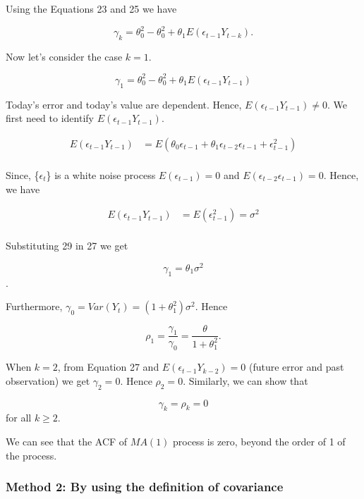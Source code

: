 \documentclass[
  11pt,
  a4paper,
]{report}
\begin{document}
Using the Equations 23 and 25 we have

\begin{equation}
  \gamma_k = \theta_0^2 - \theta_0^2 + \theta_1E(\epsilon_{t-1}Y_{t-k}).
\end{equation}

Now let's consider the case \(k=1\).

\begin{equation}
  \gamma_1 = \theta_0^2 - \theta_0^2 + \theta_1E(\epsilon_{t-1}Y_{t-1})
\end{equation}

Today's error and today's value are dependent. Hence,
\(E(\epsilon_{t-1}Y_{t-1}) \neq 0.\) We first need to identify
\(E(\epsilon_{t-1}Y_{t-1})\).

\begin{equation}
\begin{aligned}
E(\epsilon_{t-1}Y_{t-1}) &= E(\theta_0 \epsilon_{t-1} + \theta_1 \epsilon_{t-2} \epsilon_{t-1}+ \epsilon_{t-1}^2)\\
\end{aligned}
\end{equation}

Since, \{\(\epsilon_t\)\} is a white noise process
\(E(\epsilon_{t-1}) = 0\) and \(E(\epsilon_{t-2} \epsilon_{t-1}) = 0\).
Hence, we have

\begin{equation}
\begin{aligned}
E(\epsilon_{t-1}Y_{t-1}) &= E(\epsilon_{t-1}^2)=\sigma^2\\
\end{aligned}
\end{equation}

Substituting 29 in 27 we get

\[\gamma_1=\theta_1\sigma^2\].

Furthermore, \(\gamma_0 = Var(Y_t)=  (1+\theta_1^2)\sigma^2\). Hence

\[\rho_1=\frac{\gamma_1}{\gamma_0}=\frac{\theta}{1+\theta_1^2}.\]

When \(k=2\), from Equation 27 and \(E(\epsilon_{t-1}Y_{k-2}) = 0\)
(future error and past observation) we get \(\gamma_2=0\). Hence
\(\rho_2=0\). Similarly, we can show that

\[\gamma_k = \rho_k=0\] for all \(k \geq 2\).

We can see that the ACF of \(MA(1)\) process is zero, beyond the order
of 1 of the process.

\subsubsection{Method 2: By using the definition of
covariance}\label{method-2-by-using-the-definition-of-covariance}
\end{document}
